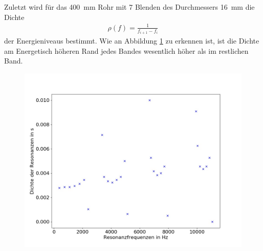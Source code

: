 Zuletzt wird für das 400~mm Rohr mit 7 Blenden des Durchmessers 16~mm die Dichte 
\begin{align*}
\rho(f)=\frac{1}{f_{i+1}-f_i}
\end{align*}
der Energieniveaus bestimmt.
Wie an Abbildung \ref{fig:dos} zu erkennen ist, ist die Dichte am Energetisch höheren Rand jedes Bandes wesentlich höher als im restlichen Band.
\begin{figure}
\centering
\includegraphics[width=\textwidth]{content/Scripts/dos.jpg}
\caption{}
\label{fig:dos}
\end{figure}
\FloatBarrier
